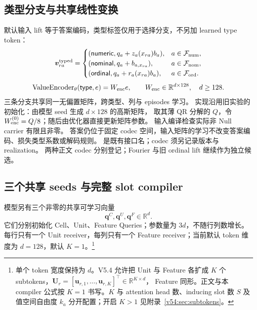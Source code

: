 \documentclass[11pt,UTF8,fontset=fandol]{ctexart}
\numberwithin{equation}{section}
\theoremstyle{definition}
\newcommand{\Fset}{\mathcal F}
\newcommand{\R}{\mathbb R}
\newcommand{\VE}{\operatorname{ValueEncoder}}
\begin{document}
\subsection{类型分支与共享线性变换}
默认输入 lift 等于答案编码，类型标签仅用于选择分支，不另加 learned type token：
\begin{equation}
 \bm v^{\rm typed}_{ra}=\begin{cases}
 (\mathsf{numeric},q_a+z_a(x_{ra})b_a),&a\in\Fset_{\rm num},\\
 (\mathsf{nominal},q_a+b_{a,x_{ra}}),&a\in\Fset_{\rm nom},\\
 (\mathsf{ordinal},q_a+r_a(x_{ra})b_a),&a\in\Fset_{\rm ord}.
 \end{cases}
 \label{eq:E:continuous-tag}
\end{equation}
\begin{equation}
 \VE_\theta(\mathsf{type},e)=W_{\rm enc}e,\qquad
 W_{\rm enc}\in\R^{d\times128},\quad d\ge128.
 \label{eq:E:nominal-encode}
\end{equation}
三条分支共享同一无偏置矩阵，跨类型、列与 episodes 学习。
实现沿用旧实验的初始化：由模型 seed 生成 $d\times128$ 的高斯矩阵，
取其薄 QR 分解的 $Q$，令 $W_{\rm enc}^{(0)}=Q/8$；随后由优化器直接更新矩阵参数。
输入编译检查实际非 Null carrier 有限且非零。
答案仍位于固定 codec 空间，输入矩阵的学习不改变答案编码、损失类型系数或解码规则。
 是既有接口名；codec 须另记录版本与 realization。
两种正文 codec 分别登记；Fourier 与旧 ordinal lift 继续作为独立候选。

\subsection{三个共享 seeds 与完整 slot compiler}
\label{subsec:E:compiler}
模型另有三个非零的共享可学习向量
\begin{equation}
\bm q^C,\bm q^U,\bm q^F\in\R^d.
\label{eq:E:semantic-seeds}
\end{equation}
它们分别初始化 Cell、Unit、Feature Queries；参数量为 $3d$，不随行列数增长。
每行只有一个 Unit receiver，每列只有一个 Feature receiver；当前默认 token 维度为
$d=128$，默认 $K=1$。\footnote{单个 token 宽度保持为 $d$。V5.4 允许把 Unit 与 Feature
各扩成 $K$ 个 subtokens，$\bm U_r=[\bm u_{r,1},\ldots,\bm u_{r,K}]^\top\in\R^{K\times d}$，
Feature 同形。正文与本 compiler 公式按 $K=1$ 书写。$K$ 与 attention head 数、inducing slot 数 $S$
及值空间自由度 $k_a$ 分开配置；开启 $K>1$ 见附录~\ref{v54:sec:subtokens}。}
\end{document}
